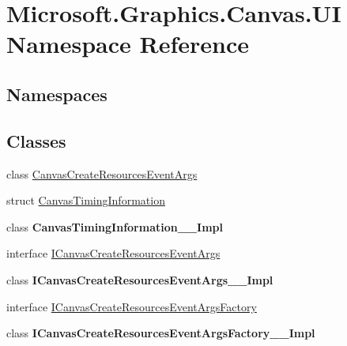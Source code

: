 \hypertarget{namespace_microsoft_1_1_graphics_1_1_canvas_1_1_u_i}{}\section{Microsoft.\+Graphics.\+Canvas.\+UI Namespace Reference}
\label{namespace_microsoft_1_1_graphics_1_1_canvas_1_1_u_i}
\subsection*{Namespaces}
\begin{DoxyCompactItemize}
\end{DoxyCompactItemize}
\subsection*{Classes}
\begin{DoxyCompactItemize}
\item 
class \hyperlink{class_microsoft_1_1_graphics_1_1_canvas_1_1_u_i_1_1_canvas_create_resources_event_args}{Canvas\+Create\+Resources\+Event\+Args}
\item 
struct \hyperlink{struct_microsoft_1_1_graphics_1_1_canvas_1_1_u_i_1_1_canvas_timing_information}{Canvas\+Timing\+Information}
\item 
class {\bfseries Canvas\+Timing\+Information\+\_\+\+\_\+\+Impl}
\item 
interface \hyperlink{interface_microsoft_1_1_graphics_1_1_canvas_1_1_u_i_1_1_i_canvas_create_resources_event_args}{I\+Canvas\+Create\+Resources\+Event\+Args}
\item 
class {\bfseries I\+Canvas\+Create\+Resources\+Event\+Args\+\_\+\+\_\+\+Impl}
\item 
interface \hyperlink{interface_microsoft_1_1_graphics_1_1_canvas_1_1_u_i_1_1_i_canvas_create_resources_event_args_factory}{I\+Canvas\+Create\+Resources\+Event\+Args\+Factory}
\item 
class {\bfseries I\+Canvas\+Create\+Resources\+Event\+Args\+Factory\+\_\+\+\_\+\+Impl}
\end{DoxyCompactItemize}
